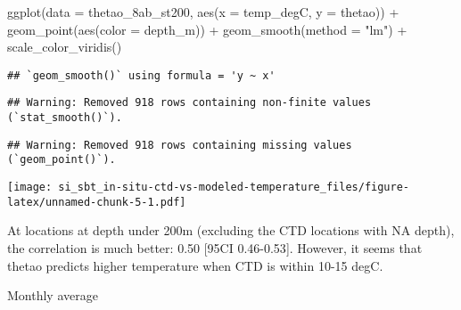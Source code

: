 \documentclass[
]{article}
\newenvironment{Shaded}{\begin{snugshade}}{\end{snugshade}}
\newcommand{\AttributeTok}[1]{\textcolor[rgb]{0.77,0.63,0.00}{#1}}
\newcommand{\FunctionTok}[1]{\textcolor[rgb]{0.00,0.00,0.00}{#1}}
\newcommand{\NormalTok}[1]{#1}
\newcommand{\SpecialCharTok}[1]{\textcolor[rgb]{0.00,0.00,0.00}{#1}}
\newcommand{\StringTok}[1]{\textcolor[rgb]{0.31,0.60,0.02}{#1}}
\begin{document}
\begin{Shaded}
\begin{Highlighting}[]
\FunctionTok{ggplot}\NormalTok{(}\AttributeTok{data =}\NormalTok{ thetao\_8ab\_st200, }\FunctionTok{aes}\NormalTok{(}\AttributeTok{x =}\NormalTok{ temp\_degC, }\AttributeTok{y =}\NormalTok{ thetao)) }\SpecialCharTok{+} \FunctionTok{geom\_point}\NormalTok{(}\FunctionTok{aes}\NormalTok{(}\AttributeTok{color =}\NormalTok{ depth\_m)) }\SpecialCharTok{+} \FunctionTok{geom\_smooth}\NormalTok{(}\AttributeTok{method =} \StringTok{"lm"}\NormalTok{) }\SpecialCharTok{+} \FunctionTok{scale\_color\_viridis}\NormalTok{()}
\end{Highlighting}
\end{Shaded}

\begin{verbatim}
## `geom_smooth()` using formula = 'y ~ x'
\end{verbatim}

\begin{verbatim}
## Warning: Removed 918 rows containing non-finite values (`stat_smooth()`).
\end{verbatim}

\begin{verbatim}
## Warning: Removed 918 rows containing missing values (`geom_point()`).
\end{verbatim}

\texttt{[image: si\_sbt\_in-situ-ctd-vs-modeled-temperature\_files/figure-latex/unnamed-chunk-5-1.pdf]}

At locations at depth under 200m (excluding the CTD locations with NA
depth), the correlation is much better: 0.50 {[}95CI 0.46-0.53{]}.
However, it seems that thetao predicts higher temperature when CTD is
within 10-15 degC.

Monthly average
\end{document}
